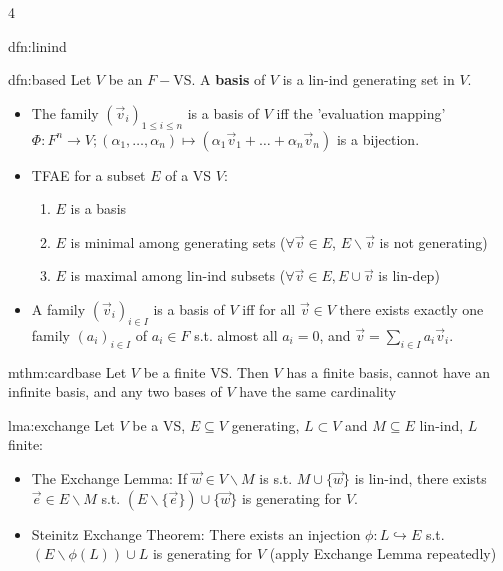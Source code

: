 \documentclass[landscape, 8pt]{extarticle}
\begin{document}
\begin{multicols*}{4}
\begin{dfn}{dfn:linind}{ }
		\end{dfn}
		
		
		\begin{dfn}[Bases]{dfn:based}{ }
			Let $V$ be an $F-$VS. A \textbf{basis} of $V$ is a lin-ind generating set in $V$.
			\begin{itemize}
				\item The family $\left(\vec{v}_i\right)_{1 \le i \le n}$ is a basis of $V$ iff the 'evaluation mapping' $\Phi: F^n \to V; (\alpha_1, \dots, \alpha_n) \mapsto (\alpha_1 \vec{v}_1 + \dots + \alpha_n \vec{v}_n)$ is a bijection.\\
				\item TFAE for a subset $E$ of a VS $V$:
					\begin{enumerate}[label = (\roman*)]
						\item $E$ is a basis 
						\item $E$ is minimal among generating sets ($\forall \vec{v} \in E$, $E \backslash\vec{v}$ is not generating)
						\item $E$ is maximal among lin-ind subsets ($\forall \vec{v} \in E, E \cup \vec{v}$ is lin-dep)	
					\end{enumerate}
				\item A family $\left(\vec{v}_i\right)_{i \in I}$ is a basis of $V$ iff for all $\vec{v} \in V$ there exists exactly one family $\left(a_i\right)_{i \in I}$ of $a_i\in F$ s.t. almost all $a_i =0$, and $\vec{v} = \sum_{i \in I} a_i \vec{v}_i$. 
			\end{itemize}
			
		\end{dfn}
		
		
		\begin{mthm}{mthm:cardbase}{ }
			Let $V$ be a finite VS. Then $V$ has a finite basis, cannot have an infinite basis, and any two bases of $V$ have the same cardinality
			
		\end{mthm}
		
		
		\begin{lma}{lma:exchange}{ }
			Let $V$ be a VS, $E \subseteq V$ generating, $L \subset V$ and $M \subseteq E$ lin-ind, $L$ finite:
			\begin{itemize}
				\item The Exchange Lemma: If $\vec{w}\in V\backslash M$ is s.t. $M \cup \{\vec{w}\}$ is lin-ind, there exists $\vec{e}\in E \backslash M$ s.t. $(E\backslash \{\vec{e}\}) \cup \{\vec{w}\}$ is generating for $V$.
				\item Steinitz Exchange Theorem: There exists an injection $\phi: L \hookrightarrow E$ s.t. $(E\backslash \phi(L)) \cup L$ is generating for $V$ (apply Exchange Lemma repeatedly)
			\end{itemize}
			

\end{lma}
\end{multicols*}
\end{document}
